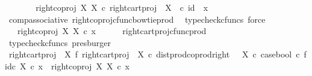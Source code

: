 \begin{isabellebody}
\ \ \isamarkupfalse%
\ \isamarkupfalse%
\ {\isachardoublequoteopen}{\isachardot}{\kern0pt}{\isachardot}{\kern0pt}{\isachardot}{\kern0pt}\ {\isacharequal}{\kern0pt}\ right{\isacharunderscore}{\kern0pt}coproj\ X\ X\ {\isasymcirc}\isactrlsub c\ right{\isacharunderscore}{\kern0pt}cart{\isacharunderscore}{\kern0pt}proj\ {\isasymone}\ X\ \ {\isasymcirc}\isactrlsub c\ {\isasymlangle}id\ {\isasymone}{\isacharcomma}{\kern0pt}\ x{\isasymrangle}{\isachardoublequoteclose}\isanewline
\ \ \ \ \isamarkupfalse%
\ comp{\isacharunderscore}{\kern0pt}associative{}\ right{\isacharunderscore}{\kern0pt}coproj{\isacharunderscore}{\kern0pt}cfunc{\isacharunderscore}{\kern0pt}bowtie{\isacharunderscore}{\kern0pt}prod\ \isamarkupfalse%
\ {\isacharparenleft}{\kern0pt}typecheck{\isacharunderscore}{\kern0pt}cfuncs{\isacharcomma}{\kern0pt}\ force{\isacharparenright}{\kern0pt}\isanewline
\ \ \isamarkupfalse%
\ \isamarkupfalse%
\ {\isachardoublequoteopen}{\isachardot}{\kern0pt}{\isachardot}{\kern0pt}{\isachardot}{\kern0pt}\ {\isacharequal}{\kern0pt}\ right{\isacharunderscore}{\kern0pt}coproj\ X\ X\ {\isasymcirc}\isactrlsub c\ x{\isachardoublequoteclose}\isanewline
\ \ \ \ \isamarkupfalse%
\ right{\isacharunderscore}{\kern0pt}cart{\isacharunderscore}{\kern0pt}proj{\isacharunderscore}{\kern0pt}cfunc{\isacharunderscore}{\kern0pt}prod\ \isamarkupfalse%
\ {\isacharparenleft}{\kern0pt}typecheck{\isacharunderscore}{\kern0pt}cfuncs{\isacharcomma}{\kern0pt}\ presburger{\isacharparenright}{\kern0pt}\isanewline
\ \ \isamarkupfalse%
\ \isamarkupfalse%
\ {\isachardoublequoteopen}{\isacharparenleft}{\kern0pt}{\isacharparenleft}{\kern0pt}right{\isacharunderscore}{\kern0pt}cart{\isacharunderscore}{\kern0pt}proj\ {\isasymone}\ X\ {\isasymbowtie}\isactrlsub f\ right{\isacharunderscore}{\kern0pt}cart{\isacharunderscore}{\kern0pt}proj\ {\isasymone}\ X{\isacharparenright}{\kern0pt}\ {\isasymcirc}\isactrlsub c\ dist{\isacharunderscore}{\kern0pt}prod{\isacharunderscore}{\kern0pt}coprod{\isacharunderscore}{\kern0pt}right\ {\isasymone}\ {\isasymone}\ X\ {\isasymcirc}\isactrlsub c\ {\isasymlangle}case{\isacharunderscore}{\kern0pt}bool\ {\isasymcirc}\isactrlsub c\ f{\isacharcomma}{\kern0pt}id\isactrlsub c\ X{\isasymrangle}{\isacharparenright}{\kern0pt}\ {\isasymcirc}\isactrlsub c\ x\ {\isacharequal}{\kern0pt}\ right{\isacharunderscore}{\kern0pt}coproj\ X\ X\ {\isasymcirc}\isactrlsub c\ x{\isachardoublequoteclose}\isanewline
\ \ \ \ \isamarkupfalse%

\end{isabellebody}
